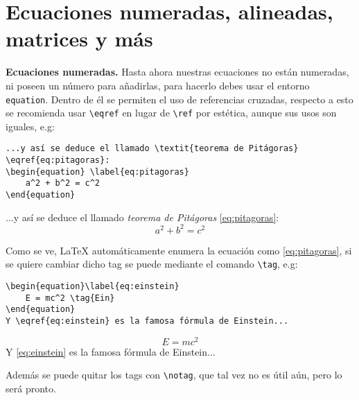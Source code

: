 \section{Ecuaciones numeradas, alineadas, matrices y más}
\textbf{Ecuaciones numeradas.} Hasta ahora nuestras ecuaciones no están numeradas, ni poseen un número para añadirlas, para hacerlo debes usar el entorno \texttt{equation}. Dentro de él se permiten el uso de referencias cruzadas, respecto a esto se recomienda usar \lstinline|\eqref| en lugar de \lstinline|\ref| por estética, aunque sus usos son iguales, e.g:
\begin{lstlisting}
...y así se deduce el llamado \textit{teorema de Pitágoras} \eqref{eq:pitagoras}:
\begin{equation} \label{eq:pitagoras}
	a^2 + b^2 = c^2
\end{equation}
\end{lstlisting}
...y así se deduce el llamado \textit{teorema de Pitágoras} \eqref{eq:pitagoras}:
\begin{equation} \label{eq:pitagoras}
	a^2 + b^2 = c^2
\end{equation}

Como se ve, \LaTeX{} automáticamente enumera la ecuación como \ref{eq:pitagoras}, si se quiere cambiar dicho tag se puede mediante el comando \lstinline|\tag|, e.g:
\begin{lstlisting}
\begin{equation}\label{eq:einstein}
	E = mc^2 \tag{Ein}
\end{equation}
Y \eqref{eq:einstein} es la famosa fórmula de Einstein...
\end{lstlisting}

\begin{equation}\label{eq:einstein}
	E = mc^2 \tag{Ein}
\end{equation}
Y \eqref{eq:einstein} es la famosa fórmula de Einstein...

Además se puede quitar los tags con \lstinline|\notag|, que tal vez no es útil aún, pero lo será pronto.

